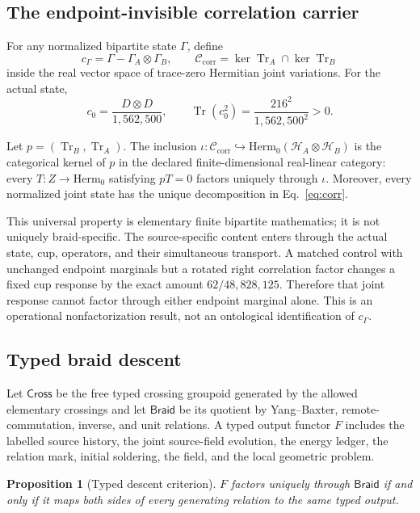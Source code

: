 \documentclass[11pt]{article}
\newtheorem{proposition}[theorem]{Proposition}
\theoremstyle{definition}
\theoremstyle{remark}
\newcommand{\cH}{\mathcal{H}}
\newcommand{\cC}{\mathcal{C}}
\newcommand{\Tr}{\operatorname{Tr}}
\newcommand{\Ker}{\operatorname{ker}}
\begin{document}
\subsection{The endpoint-invisible correlation carrier}

For any normalized bipartite state $\Gamma$, define
\begin{equation}\label{eq:corr}
  c_\Gamma=\Gamma-\Gamma_A\otimes\Gamma_B,
  \qquad
  \cC_{\mathrm{corr}}=\Ker\Tr_A\cap\Ker\Tr_B
\end{equation}
inside the real vector space of trace-zero Hermitian joint variations. For the actual state,
\begin{equation}
  c_0=\frac{D\otimes D}{1{,}562{,}500},
  \qquad
  \Tr(c_0^2)=\frac{216^2}{1{,}562{,}500^2}>0.
\end{equation}

Let $p=(\Tr_B,\Tr_A)$. The inclusion
$\iota:\cC_{\mathrm{corr}}\hookrightarrow\mathrm{Herm}_0(\cH_A\otimes\cH_B)$
is the categorical kernel of $p$ in the declared finite-dimensional real-linear category: every $T:Z\to\mathrm{Herm}_0$ satisfying $pT=0$ factors uniquely through $\iota$. Moreover, every normalized joint state has the unique decomposition in Eq.~\eqref{eq:corr}.

This universal property is elementary finite bipartite mathematics; it is not uniquely braid-specific. The source-specific content enters through the actual state, cup, operators, and their simultaneous transport. A matched control with unchanged endpoint marginals but a rotated right correlation factor changes a fixed cup response by the exact amount $62/48{,}828{,}125$. Therefore that joint response cannot factor through either endpoint marginal alone. This is an operational nonfactorization result, not an ontological identification of $c_\Gamma$.

\subsection{Typed braid descent}

Let $\mathsf{Cross}$ be the free typed crossing groupoid generated by the allowed elementary crossings and let $\mathsf{Braid}$ be its quotient by Yang--Baxter, remote-commutation, inverse, and unit relations. A typed output functor $F$ includes the labelled source history, the joint source-field evolution, the energy ledger, the relation mark, initial soldering, the field, and the local geometric problem.

\begin{proposition}[Typed descent criterion]\label{prop:descent}
$F$ factors uniquely through $\mathsf{Braid}$ if and only if it maps both sides of every generating relation to the same typed output.
\end{proposition}
\end{document}
